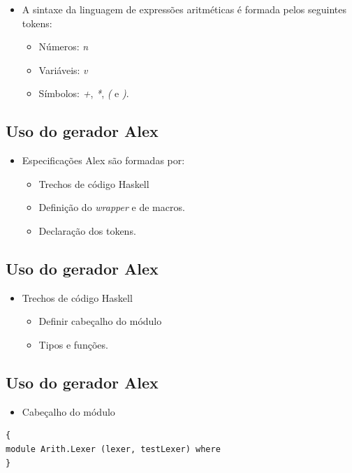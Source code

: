 \documentclass[11pt]{article}
\begin{document}
\begin{itemize}
\item A sintaxe da linguagem de expressões aritméticas é formada pelos seguintes tokens:
\begin{itemize}
\item Números: \emph{n}
\item Variáveis: \emph{v}
\item Símbolos: \emph{+}, \emph{*}, \emph{(} e \emph{)}.
\end{itemize}
\end{itemize}
\subsection*{Uso do gerador Alex}
\label{sec:org9a3af41}

\begin{itemize}
\item Especificações Alex são formadas por:
\begin{itemize}
\item Trechos de código Haskell
\item Definição do \emph{wrapper} e de macros.
\item Declaração dos tokens.
\end{itemize}
\end{itemize}
\subsection*{Uso do gerador Alex}
\label{sec:orga70047e}

\begin{itemize}
\item Trechos de código Haskell
\begin{itemize}
\item Definir cabeçalho do módulo
\item Tipos e funções.
\end{itemize}
\end{itemize}
\subsection*{Uso do gerador Alex}
\label{sec:orgb0895da}

\begin{itemize}
\item Cabeçalho do módulo
\end{itemize}

\begin{verbatim}
{
module Arith.Lexer (lexer, testLexer) where
}
\end{verbatim}
\end{document}

